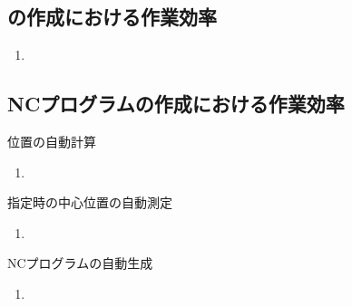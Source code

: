 \clearpage


\subsection{\Drawing の作成における作業効率}

\begin{Issues}{\TBW}
\begin{enumerate}[label=\sarrow]
\item[{\sarrow[red]}]
\end{enumerate}
\end{Issues}


\subsection{NCプログラムの作成における作業効率}

\begin{Issues}{\KeywayCenter 位置の自動計算\TBW}
\begin{enumerate}[label=\sarrow]
\item[{\sarrow[red]}]
\end{enumerate}
\end{Issues}

\begin{Issues}{\AsideKeywayDepth 指定時の中心位置の自動測定\TBW}
\begin{enumerate}[label=\sarrow]
\item[{\sarrow[red]}]
\end{enumerate}
\end{Issues}

\begin{Issues}{NCプログラムの自動生成\TBW}
\begin{enumerate}[label=\sarrow]
\item[{\sarrow[red]}]
\end{enumerate}
\end{Issues}


